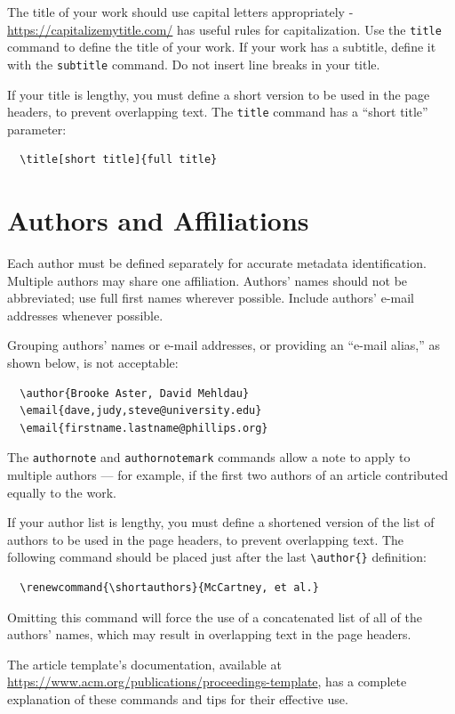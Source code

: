 \documentclass[sigconf, authordraft]{acmart}
\begin{document}
	The title of your work should use capital letters appropriately -
	\url{https://capitalizemytitle.com/} has useful rules for capitalization. Use the
	{\verb|title|} command to define the title of your work. If your work has a
	subtitle, define it with the {\verb|subtitle|} command. Do not insert line
	breaks in your title.

	If your title is lengthy, you must define a short version to be used in the page
	headers, to prevent overlapping text. The \verb|title| command has a ``short title''
	parameter: \begin{verbatim}
  \title[short title]{full title}
\end{verbatim}

	\section{Authors and Affiliations}


	Each author must be defined separately for accurate metadata identification.
	Multiple authors may share one affiliation. Authors' names should not be
	abbreviated; use full first names wherever possible. Include authors' e-mail addresses
	whenever possible.

	Grouping authors' names or e-mail addresses, or providing an ``e-mail alias,''
	as shown below, is not acceptable:
	\begin{verbatim}
  \author{Brooke Aster, David Mehldau}
  \email{dave,judy,steve@university.edu}
  \email{firstname.lastname@phillips.org}
\end{verbatim}

	The \verb|authornote| and \verb|authornotemark| commands allow a note to apply
	to multiple authors --- for example, if the first two authors of an article
	contributed equally to the work.

	If your author list is lengthy, you must define a shortened version of the list
	of authors to be used in the page headers, to prevent overlapping text. The following
	command should be placed just after the last \verb|\author{}| definition:
	\begin{verbatim}
  \renewcommand{\shortauthors}{McCartney, et al.}
\end{verbatim}
	Omitting this command will force the use of a concatenated list of all of the
	authors' names, which may result in overlapping text in the page headers.

	The article template's documentation, available at \url{https://www.acm.org/publications/proceedings-template},
	has a complete explanation of these commands and tips for their effective use.
\end{document}
